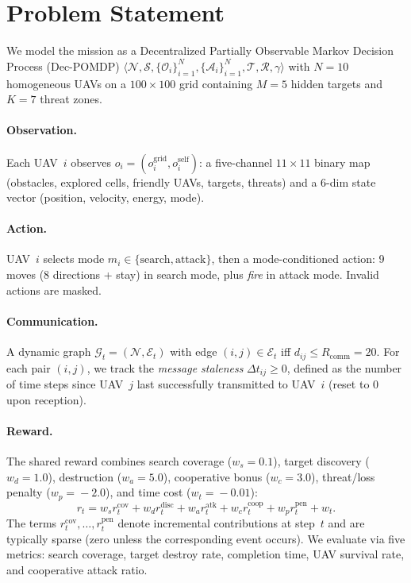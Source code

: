 
\section{Problem Statement}
\label{sec:problem}

We model the mission as a Decentralized Partially Observable Markov Decision
Process (Dec-POMDP) $\langle \mathcal{N}, \mathcal{S}, \{\mathcal{O}_i\}_{i=1}^{N},
\{\mathcal{A}_i\}_{i=1}^{N}, \mathcal{T}, \mathcal{R}, \gamma \rangle$ with
$N\!=\!10$ homogeneous UAVs on a $100\!\times\!100$ grid containing $M\!=\!5$
hidden targets and $K\!=\!7$ threat zones.

\paragraph{Observation.}
Each UAV~$i$ observes $o_i = (o_i^{\text{grid}}, o_i^{\text{self}})$: a
five-channel $11\!\times\!11$ binary map (obstacles, explored cells, friendly
UAVs, targets, threats) and a 6-dim state vector (position, velocity, energy,
mode).

\paragraph{Action.}
UAV~$i$ selects mode $m_i \!\in\! \{\text{search}, \text{attack}\}$, then a
mode-conditioned action: 9 moves (8 directions + stay) in search mode, plus
\emph{fire} in attack mode.  Invalid actions are masked.

\paragraph{Communication.}
A dynamic graph $\mathcal{G}_t\!=\!(\mathcal{N}, \mathcal{E}_t)$ with edge
$(i,j) \!\in\! \mathcal{E}_t$ iff $d_{ij} \!\leq\! R_{\text{comm}}\!=\!20$.
For each pair $(i,j)$, we track the \emph{message staleness}
$\Delta t_{ij} \!\geq\! 0$, defined as the number of time steps since UAV~$j$
last successfully transmitted to UAV~$i$ (reset to 0 upon reception).

\paragraph{Reward.}
The shared reward combines search coverage ($w_s\!=\!0.1$), target discovery
($w_d\!=\!1.0$), destruction ($w_a\!=\!5.0$), cooperative bonus
($w_c\!=\!3.0$), threat/loss penalty ($w_p\!=\!{-}2.0$), and time cost
($w_t\!=\!{-}0.01$):
\begin{equation}
  r_t = w_s r_t^{\text{cov}} + w_d r_t^{\text{disc}} + w_a r_t^{\text{atk}}
  + w_c r_t^{\text{coop}} + w_p r_t^{\text{pen}} + w_t.
  \label{eq:reward}
\end{equation}
The terms $r_t^{\text{cov}},\ldots,r_t^{\text{pen}}$ denote incremental
contributions at step~$t$ and are typically sparse (zero unless the corresponding
event occurs).
We evaluate via five metrics: search coverage, target destroy rate,
completion time, UAV survival rate, and cooperative attack ratio.
